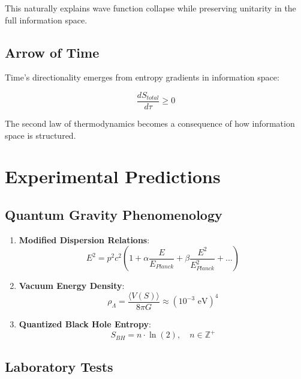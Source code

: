 \documentclass{article}
\begin{document}
This naturally explains wave function collapse while preserving unitarity in the full information space.

\subsection{Arrow of Time}

Time's directionality emerges from entropy gradients in information space:

\begin{equation}
\frac{dS_{total}}{d\tau} \geq 0
\end{equation}

The second law of thermodynamics becomes a consequence of how information space is structured.

\section{Experimental Predictions}

\subsection{Quantum Gravity Phenomenology}

\begin{enumerate}
\item \textbf{Modified Dispersion Relations}:
   \begin{equation}
   E^2 = p^2c^2\left(1 + \alpha \frac{E}{E_{Planck}} + \beta \frac{E^2}{E_{Planck}^2} + ...\right)
   \end{equation}

\item \textbf{Vacuum Energy Density}:
   \begin{equation}
   \rho_\Lambda = \frac{\langle V(S) \rangle}{8\pi G} \approx (10^{-3} \text{ eV})^4
   \end{equation}

\item \textbf{Quantized Black Hole Entropy}:
   \begin{equation}
   S_{BH} = n \cdot \ln(2), \quad n \in \mathbb{Z}^+
   \end{equation}
\end{enumerate}

\subsection{Laboratory Tests}
\end{document}

